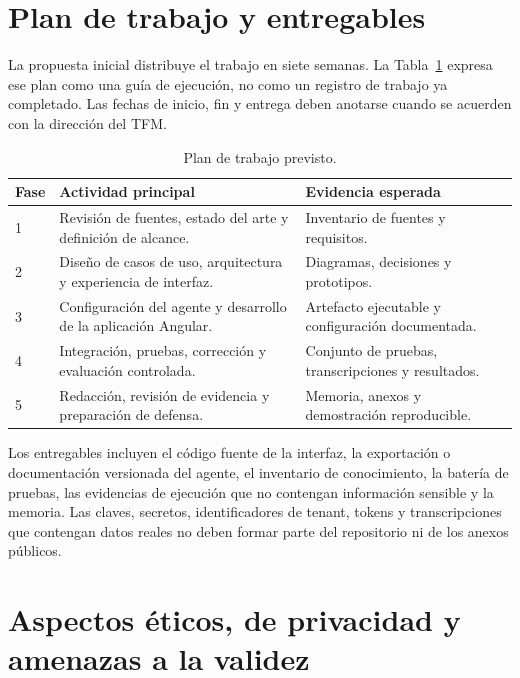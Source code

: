 \documentclass[12pt,twoside,titlepage]{book}
\begin{document}
\section{Plan de trabajo y entregables}
\label{sec:plan-trabajo}

La propuesta inicial distribuye el trabajo en siete semanas. La
Tabla~\ref{tab:plan-trabajo} expresa ese plan como una guía de ejecución, no como
un registro de trabajo ya completado. Las fechas de inicio, fin y entrega deben
anotarse cuando se acuerden con la dirección del TFM.

\begin{table}[H]
\centering
\caption{Plan de trabajo previsto.}
\label{tab:plan-trabajo}
\begin{tabular}{@{}p{}p{}p{}@{}}
\hline
\textbf{Fase} & \textbf{Actividad principal} & \textbf{Evidencia esperada}\\
\hline
1 & Revisión de fuentes, estado del arte y definición de alcance. & Inventario de
fuentes y requisitos.\\
2 & Diseño de casos de uso, arquitectura y experiencia de interfaz. & Diagramas,
decisiones y prototipos.\\
3 & Configuración del agente y desarrollo de la aplicación Angular. & Artefacto
ejecutable y configuración documentada.\\
4 & Integración, pruebas, corrección y evaluación controlada. & Conjunto de
pruebas, transcripciones y resultados.\\
5 & Redacción, revisión de evidencia y preparación de defensa. & Memoria,
anexos y demostración reproducible.\\
\hline
\end{tabular}
\end{table}

Los entregables incluyen el código fuente de la interfaz, la exportación o
documentación versionada del agente, el inventario de conocimiento, la batería de
pruebas, las evidencias de ejecución que no contengan información sensible y la
memoria. Las claves, secretos, identificadores de tenant, tokens y transcripciones
que contengan datos reales no deben formar parte del repositorio ni de los anexos
públicos.

\section{Aspectos éticos, de privacidad y amenazas a la validez}
\label{sec:etica-validez}
\end{document}
